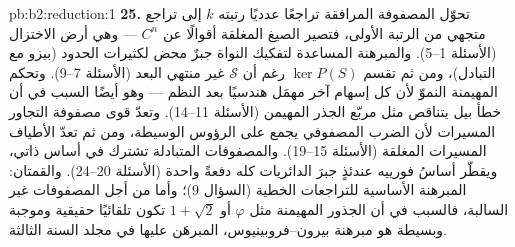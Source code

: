 \begin{solution}{pb:b2:reduction:1}
\textbf{25.} تحوّل المصفوفة المرافقة تراجعًا عدديًا
رتبته $k$ إلى تراجع متجهي من الرتبة الأولى، فتصير
الصيغ المغلقة أقوالًا عن $C^n$ --- وهي أرض
الاختزال (الأسئلة 1--5). والمبرهنة المساعدة لتفكيك النواة
جبرٌ محض لكثيرات الحدود (بيزو مع التبادل)، ومن ثم تقسم
$\ker P(S)$ رغم أن $\mathcal{S}$ غير منتهي البعد
(الأسئلة 7--9). وتحكم  المهيمنة النموّ لأن
كل إسهام آخر مهمَل هندسيًا بعد
النظم --- وهو أيضًا السبب في أن خطأ بيل يتناقص مثل
مربّع الجذر المهيمن (الأسئلة 11--14). وتعدّ قوى
مصفوفة التجاور المسيرات لأن الضرب المصفوفي يجمع
على الرؤوس الوسيطة، ومن ثم تعدّ الأطياف المسيرات المغلقة
(الأسئلة 15--19). والمصفوفات المتبادلة تشترك في أساس ذاتي،
ويقطّر أساسُ فورييه عندئذٍ جبرَ الدائريات كله
دفعةً واحدة (الأسئلة 20--24). والقمتان: المبرهنة الأساسية
للتراجعات الخطية (السؤال 9)؛ وأما من أجل المصفوفات غير السالبة،
فالسبب في أن الجذور المهيمنة مثل $\varphi$ أو $1 +
\sqrt2$ تكون تلقائيًا حقيقية وموجبة وبسيطة هو
مبرهنة بيرون--فروبينيوس، المبرهَن عليها في مجلد السنة الثالثة.
\end{solution}
